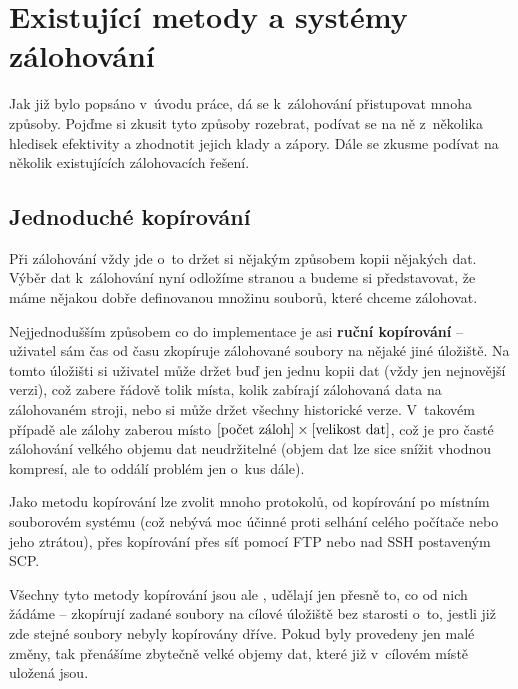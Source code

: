 \chapter{Existující metody a systémy zálohování}

Jak již bylo popsáno v~úvodu práce, dá se k~zálohování přistupovat mnoha způsoby.
Pojďme si zkusit tyto způsoby rozebrat, podívat se na ně z~několika hledisek
efektivity a zhodnotit jejich klady a zápory. Dále se zkusme podívat na
několik existujících zálohovacích řešení.

\section{Jednoduché kopírování}

Při zálohování vždy jde o~to držet si nějakým způsobem kopii nějakých dat. Výběr
dat k~zálohování nyní odložíme stranou a budeme si představovat, že máme nějakou
dobře definovanou množinu souborů, které chceme zálohovat.


Nejjednodušším způsobem co do implementace je asi {\bf ruční kopírování} --
uživatel sám čas od času zkopíruje zálohované soubory na nějaké jiné úložiště.
Na tomto úložišti si uživatel může držet buď jen jednu kopii dat (vždy jen
nejnovější verzi), což zabere řádově tolik místa, kolik zabírají zálohovaná data
na zálohovaném stroji, nebo si může držet všechny historické verze. V~takovém
případě ale zálohy zaberou místo $[\hbox{počet záloh}]\times[\hbox{velikost dat}]$,
což je pro časté zálohování velkého objemu dat neudržitelné (objem dat lze sice
snížit vhodnou kompresí, ale to oddálí problém jen o~kus dále).

Jako metodu kopírování lze zvolit mnoho protokolů, od kopírování po místním
souborovém systému (což nebývá moc účinné proti selhání celého počítače nebo
jeho ztrátou), přes kopírování přes síť pomocí \gls{FTP} nebo nad \gls{SSH}
postaveným \gls{SCP}.

Všechny tyto metody kopírování jsou ale , udělají jen přesně to, co
od nich žádáme -- zkopírují zadané soubory na cílové úložiště bez starosti o~to,
jestli již zde stejné soubory nebyly kopírovány dříve. Pokud byly provedeny jen
malé změny, tak přenášíme zbytečně velké objemy dat, které již v~cílovém místě
uložená jsou.

